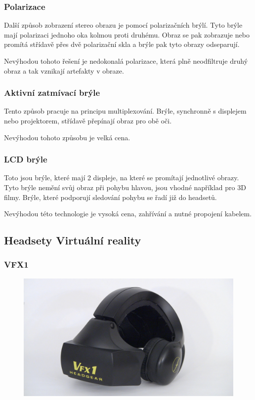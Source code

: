 \subsubsection{Polarizace}

Další způsob zobrazení stereo obrazu je pomocí polarizačních brýlí. Tyto brýle mají polarizaci jednoho oka kolmou proti druhému. Obraz se pak zobrazuje nebo promítá střídavě přes dvě polarizační skla a brýle pak tyto obrazy odseparují.

Nevýhodou tohoto řešení je nedokonalá polarizace, která plně neodfiltruje druhý obraz a tak vznikají artefakty v obraze.

\subsubsection{Aktivní zatmívací brýle}

Tento způsob pracuje na principu multiplexování. Brýle, synchronně s displejem nebo projektorem, střídavě přepínají obraz pro obě oči.

Nevýhodou tohoto způsobu je velká cena.

\subsubsection{LCD brýle}

Toto jsou brýle, které mají 2 displeje, na které se promítají jednotlivé obrazy. Tyto brýle nemění svůj obraz při pohybu hlavou, jsou vhodné například pro 3D filmy. Brýle, které podporují sledování pohybu se řadí již do headsetů.

Nevýhodou této technologie je vysoká cena, zahřívání a nutné propojení kabelem.

\subsection{Headsety Virtuální reality}

\subsubsection{VFX1}

\begin{figure}
	\centering
	\includegraphics[keepaspectratio,width=\textwidth]{obrazky/vfx1}
\end{figure}


